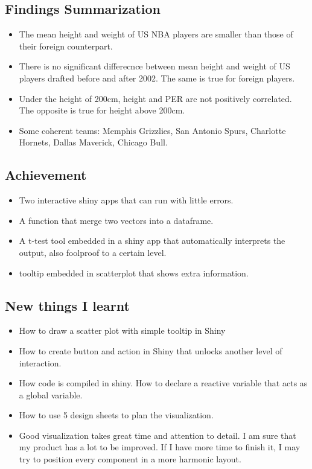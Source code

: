 \documentclass[a4paper,12pt,twoside]{article}
\numberwithin{equation}{section}
\begin{document}
\subsection{Findings Summarization}
\begin{itemize}
\item The mean height and weight of US NBA players are smaller than those of their foreign counterpart.
\item There is no significant differecnce between mean height and weight of US players drafted before and after 2002. The same is true for foreign players.

\item Under the height of 200cm, height and PER are not positively correlated. The opposite is true for height above 200cm.

\item Some coherent teams: Memphis Grizzlies, San Antonio Spurs, Charlotte Hornets, Dallas Maverick, Chicago Bull.
\end{itemize}
\subsection{Achievement}
\begin{itemize}
\item Two interactive shiny apps that can run with little errors.
\item A function that merge two vectors into a dataframe.
\item A t-test tool embedded in a shiny app that automatically interprets the output, also foolproof to a certain level.
\item tooltip embedded in scatterplot that shows extra information.
\end{itemize}
\subsection{New things I learnt}
\begin{itemize}
\item How to draw a scatter plot with simple tooltip in Shiny
\item How to create button and action in Shiny that unlocks another level of interaction.
\item How code is compiled in shiny. How to declare a reactive variable that acts as a global variable.
\item How to use 5 design sheets to plan the visualization.
\item Good visualization takes great time and attention to detail. I am sure that my product has a lot to be improved. If I have more time to finish it, I may try to position every component in a more harmonic layout.
\end{itemize}
\end{document}
